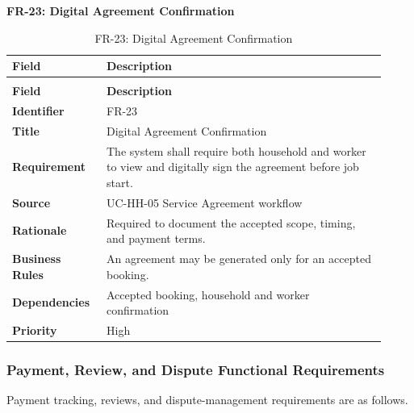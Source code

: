 \documentclass[12pt,a4paper]{article}
\begin{document}
\noindent\textbf{FR-23: Digital Agreement Confirmation}\par
\vspace{4pt}
\begingroup\small\setlength{\tabcolsep}{4pt}\renewcommand{\arraystretch}{1.15}
\begin{longtable}{|>{\raggedright\arraybackslash}p{0.22\linewidth}|>{\raggedright\arraybackslash}p{0.70\linewidth}|}
\caption{FR-23: Digital Agreement Confirmation}\label{tab:fr-23}\\
\hline
\textbf{Field} & \textbf{Description} \\ \hline
\endfirsthead
\multicolumn{2}{c}{Table \thetable\ Digital Agreement Confirmation (continued)}\\
\hline
\textbf{Field} & \textbf{Description} \\ \hline
\endhead
\textbf{Identifier} & FR-23 \\ \hline
\textbf{Title} & Digital Agreement Confirmation \\ \hline
\textbf{Requirement} & The system shall require both household and worker to view and digitally sign the agreement before job start. \\ \hline
\textbf{Source} & UC-HH-05 Service Agreement workflow \\ \hline
\textbf{Rationale} & Required to document the accepted scope, timing, and payment terms. \\ \hline
\textbf{Business Rules} & An agreement may be generated only for an accepted booking. \\ \hline
\textbf{Dependencies} & Accepted booking, household and worker confirmation \\ \hline
\textbf{Priority} & High \\ \hline
\end{longtable}
\endgroup

\subsubsection{Payment, Review, and Dispute Functional Requirements}
Payment tracking, reviews, and dispute-management requirements are as follows.
\end{document}
